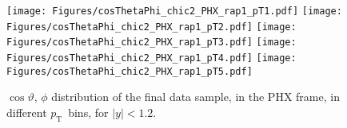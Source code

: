 \documentclass[12pt]{article}
\newcommand{\pt}{$p_{\mathrm{T}}$}
\begin{document}

\begin{figure}[htbp]
\centering
\texttt{[image: Figures/cosThetaPhi\_chic2\_PHX\_rap1\_pT1.pdf]}
\texttt{[image: Figures/cosThetaPhi\_chic2\_PHX\_rap1\_pT2.pdf]}
\texttt{[image: Figures/cosThetaPhi\_chic2\_PHX\_rap1\_pT3.pdf]}
\texttt{[image: Figures/cosThetaPhi\_chic2\_PHX\_rap1\_pT4.pdf]}
\texttt{[image: Figures/cosThetaPhi\_chic2\_PHX\_rap1\_pT5.pdf]}
\caption{$\cos\vartheta,\,\phi$ distribution of the final data sample, 
	in the PHX frame, in different \pt\ bins, for $|y| < 1.2$.}
\end{figure}
\clearpage

%
%
%
\end{document}
